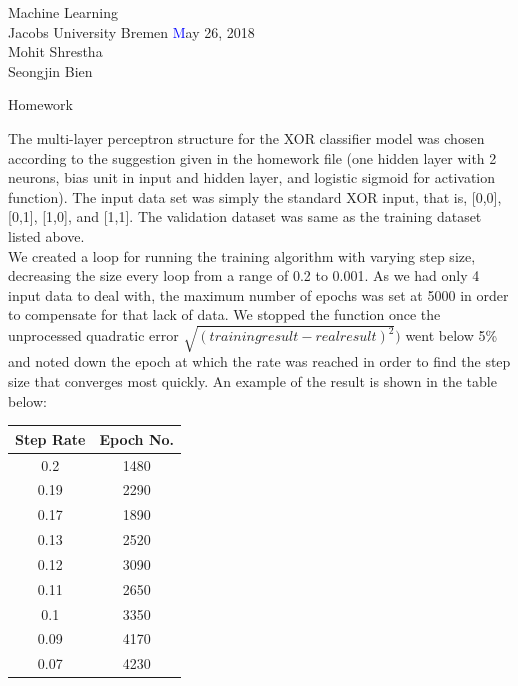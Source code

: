 \documentclass[a4paper]{article}
\newcommand{\coursename}{Machine Learning}
\newcommand{\sheettitle}{Homework}
\newcommand{\mytoday}{\textcolor{blue} May 26, 2018}
\newcounter{assignmentno}
\newcommand{\assignment}{\arabic{assignmentno}}
\begin{document}
\coursename \\
Jacobs University Bremen \hfill \mytoday\\
Mohit Shrestha\\
Seongjin Bien\hfill
\vspace*{0.3cm}\\
\begin{center}
{\Large \sheettitle{} \textcolor{blue}{\assignment}\\}
\end{center}
The multi-layer perceptron structure for the XOR classifier model was chosen according to the suggestion given in the homework file (one hidden layer with 2 neurons, bias unit in input and hidden layer, and logistic sigmoid for activation function). The input data set was simply the standard XOR input, that is, [0,0], [0,1], [1,0], and [1,1]. The validation dataset was same as the training dataset listed above.\\

We created a loop for running the training algorithm with varying step size, decreasing the size every loop from a range of 0.2 to 0.001. As we had only 4 input data to deal with, the maximum number of epochs was set at 5000 in order to compensate for that lack of data. We stopped the function once the unprocessed quadratic error $\sqrt{(training result - real result)^2})$ went below 5\% and noted down the epoch at which the rate was reached in order to find the step size that converges most quickly. An example of the result is shown in the table below:\\
\begin{center}
\begin{tabular}{| c | c |} \hline
	Step Rate & Epoch No. \\\hline
	0.2 & 1480 \\
	0.19 & 2290 \\
	0.17 & 1890 \\
	0.13 & 2520 \\
	0.12 & 3090 \\
	0.11 & 2650 \\
	0.1 & 3350 \\
	0.09 & 4170 \\
	0.07 & 4230 \\ \hline
\end{tabular}
\end{center}
\end{document}
